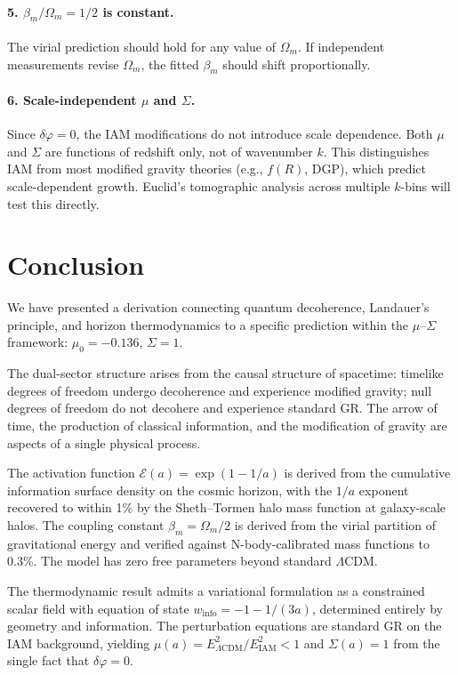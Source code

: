 \documentclass[11pt]{article}
\begin{document}
\paragraph{5. $\beta_m/\Omega_m = 1/2$ is constant.}
The virial prediction should hold for any value of $\Omega_m$.  If
independent measurements revise $\Omega_m$, the fitted $\beta_m$ should
shift proportionally.

\paragraph{6. Scale-independent $\mu$ and $\Sigma$.}
Since $\delta\varphi = 0$, the IAM modifications do not introduce scale
dependence.  Both $\mu$ and
$\Sigma$ are functions of redshift only, not of wavenumber $k$.  This
distinguishes IAM from most modified gravity theories (e.g., $f(R)$, DGP),
which predict scale-dependent growth.  Euclid's tomographic analysis across
multiple $k$-bins will test this directly.


\section{Conclusion}
\label{sec:conclusion}

We have presented a derivation connecting quantum decoherence, Landauer's
principle, and horizon thermodynamics to a specific prediction within the
$\mu$--$\Sigma$ framework: $\mu_0 = -0.136$, $\Sigma = 1$.

The dual-sector structure arises from the causal structure of spacetime:
timelike degrees of freedom undergo decoherence and experience modified
gravity; null degrees of freedom do not decohere and experience standard GR.
The arrow of time, the production of classical information, and the
modification of gravity are aspects of a single physical process.

The activation function $\mathcal{E}(a) = \exp(1-1/a)$ is derived from the
cumulative information surface density on the cosmic horizon, with the
$1/a$ exponent recovered to within 1\% by the Sheth--Tormen halo mass
function at galaxy-scale halos.  The coupling constant $\beta_m = \Omega_m/2$
is derived from the virial partition of gravitational energy and verified
against N-body-calibrated mass functions to 0.3\%.  The model has zero free
parameters beyond standard $\Lambda$CDM.

The thermodynamic result admits a variational formulation as a constrained
scalar field with equation of state $w_\mathrm{info} = -1 - 1/(3a)$,
determined entirely by geometry and information.  The perturbation equations
are standard GR on the IAM background, yielding
$\mu(a) = E^2_{\Lambda\mathrm{CDM}}/E^2_\mathrm{IAM} < 1$ and
$\Sigma(a) = 1$ from the single fact that $\delta\varphi = 0$.
\end{document}
